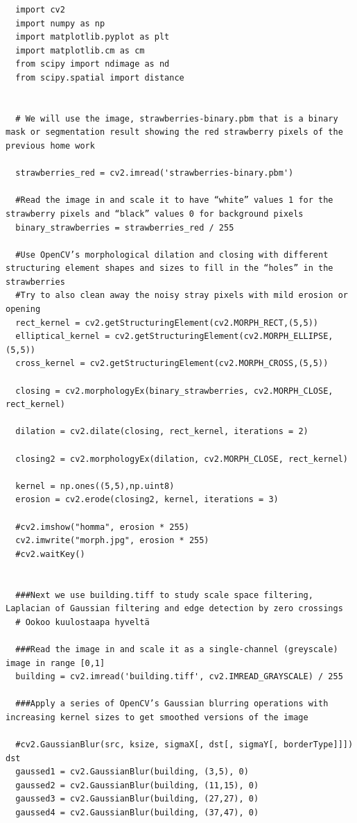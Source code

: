 \documentclass{article}
\begin{document}
\begin{verbatim}
  import cv2
  import numpy as np
  import matplotlib.pyplot as plt
  import matplotlib.cm as cm
  from scipy import ndimage as nd
  from scipy.spatial import distance


  # We will use the image, strawberries-binary.pbm that is a binary mask or segmentation result showing the red strawberry pixels of the previous home work

  strawberries_red = cv2.imread('strawberries-binary.pbm')

  #Read the image in and scale it to have “white” values 1 for the strawberry pixels and “black” values 0 for background pixels
  binary_strawberries = strawberries_red / 255

  #Use OpenCV’s morphological dilation and closing with different structuring element shapes and sizes to fill in the “holes” in the strawberries
  #Try to also clean away the noisy stray pixels with mild erosion or opening
  rect_kernel = cv2.getStructuringElement(cv2.MORPH_RECT,(5,5))
  elliptical_kernel = cv2.getStructuringElement(cv2.MORPH_ELLIPSE,(5,5))
  cross_kernel = cv2.getStructuringElement(cv2.MORPH_CROSS,(5,5))

  closing = cv2.morphologyEx(binary_strawberries, cv2.MORPH_CLOSE, rect_kernel)

  dilation = cv2.dilate(closing, rect_kernel, iterations = 2)

  closing2 = cv2.morphologyEx(dilation, cv2.MORPH_CLOSE, rect_kernel)

  kernel = np.ones((5,5),np.uint8)
  erosion = cv2.erode(closing2, kernel, iterations = 3)

  #cv2.imshow("homma", erosion * 255)
  cv2.imwrite("morph.jpg", erosion * 255)
  #cv2.waitKey()


  ###Next we use building.tiff to study scale space filtering, Laplacian of Gaussian filtering and edge detection by zero crossings
  # Ookoo kuulostaapa hyveltä

  ###Read the image in and scale it as a single-channel (greyscale) image in range [0,1]
  building = cv2.imread('building.tiff', cv2.IMREAD_GRAYSCALE) / 255

  ###Apply a series of OpenCV’s Gaussian blurring operations with increasing kernel sizes to get smoothed versions of the image

  #cv2.GaussianBlur(src, ksize, sigmaX[, dst[, sigmaY[, borderType]]])  dst
  gaussed1 = cv2.GaussianBlur(building, (3,5), 0)
  gaussed2 = cv2.GaussianBlur(building, (11,15), 0)
  gaussed3 = cv2.GaussianBlur(building, (27,27), 0)
  gaussed4 = cv2.GaussianBlur(building, (37,47), 0)


\end{verbatim}
\end{document}
